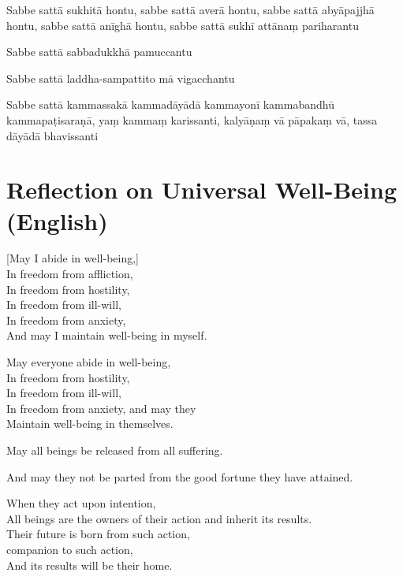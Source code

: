 Sabbe sattā sukhitā hontu, sabbe sattā averā hontu, sabbe sattā abyāpajjhā
hontu, sabbe sattā anīghā hontu, sabbe sattā sukhī attānaṃ pariharantu

Sabbe sattā sabbadukkhā pamuccantu

Sabbe sattā laddha-sampattito mā vigacchantu

Sabbe sattā kammassakā kammadāyādā kammayonī kammabandhū kammapaṭisaraṇā,
yaṃ kammaṃ karissanti, kalyāṇaṃ vā pāpakaṃ vā, tassa dāyādā bhavissanti


\section{Reflection on Universal Well-Being (English)}


\begin{leader}
\end{leader}


[May I abide in well-being,]\\
In freedom from affliction,\\
In freedom from hostility,\\
In freedom from ill-will,\\
In freedom from anxiety,\\
And may I maintain well-being in myself.

May everyone abide in well-being,\\
In freedom from hostility,\\
In freedom from ill-will,\\
In freedom from anxiety, and may they\\
Maintain well-being in themselves.

May all beings be released from all suffering.

And may they not be parted from the good fortune they have attained.

When they act upon intention,\\
All beings are the owners of their action and inherit its results.\\
Their future is born from such action,\\
companion to such action,\\
And its results will be their home.

